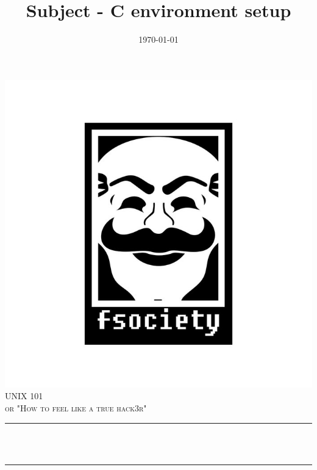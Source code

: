 \documentclass[12pt]{article}
\title{Subject - C environment setup}								%
\date{\today}											%
\makeatletter
\let\thetitle\@title
\let\thedate\@date
\makeatother
\begin{document}

\begin{titlepage}
	\centering
    \vspace*{0.5 cm}
    \includegraphics[scale = 0.3]{resources/logo4.png}\\[1.0 cm]
    \textsc{\LARGE \newline\newline UNIX 101}\\[2.0 cm]
	\textsc{\Large or "How to feel like a true hack3r"}\\[0.5 cm]
	\rule{\linewidth}{0.2 mm} \\[0.4 cm]
	{ \huge \bfseries \thetitle}\\
	\rule{\linewidth}{0.2 mm} \\[1.5 cm]
	
    \thedate
    
    
    
	
\end{titlepage}


\tableofcontents
\pagebreak

\end{document}
